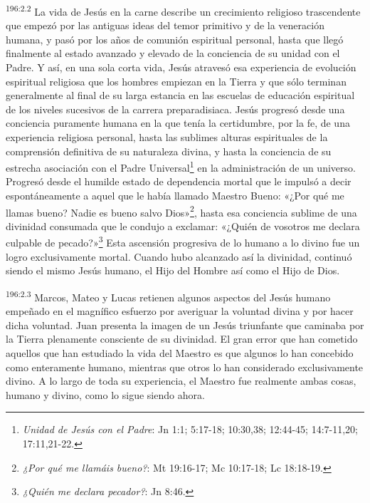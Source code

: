 \par 
\textsuperscript{196:2.2} La vida de Jesús en la carne describe un crecimiento religioso trascendente que empezó por las antiguas ideas del temor primitivo y de la veneración humana, y pasó por los años de comunión espiritual personal, hasta que llegó finalmente al estado avanzado y elevado de la conciencia de su unidad con el Padre. Y así, en una sola corta vida, Jesús atravesó esa experiencia de evolución espiritual religiosa que los hombres empiezan en la Tierra y que sólo terminan generalmente al final de su larga estancia en las escuelas de educación espiritual de los niveles sucesivos de la carrera preparadisiaca. Jesús progresó desde una conciencia puramente humana en la que tenía la certidumbre, por la fe, de una experiencia religiosa personal, hasta las sublimes alturas espirituales de la comprensión definitiva de su naturaleza divina, y hasta la conciencia de su estrecha asociación con el Padre Universal\footnote{\textit{Unidad de Jesús con el Padre}: Jn 1:1; 5:17-18; 10:30,38; 12:44-45; 14:7-11,20; 17:11,21-22.} en la administración de un universo. Progresó desde el humilde estado de dependencia mortal que le impulsó a decir espontáneamente a aquel que le había llamado Maestro Bueno: «¿Por qué me llamas bueno? Nadie es bueno salvo Dios»\footnote{\textit{¿Por qué me llamáis bueno?}: Mt 19:16-17; Mc 10:17-18; Lc 18:18-19.}, hasta esa conciencia sublime de una divinidad consumada que le condujo a exclamar: «¿Quién de vosotros me declara culpable de pecado?»\footnote{\textit{¿Quién me declara pecador?}: Jn 8:46.} Esta ascensión progresiva de lo humano a lo divino fue un logro exclusivamente mortal. Cuando hubo alcanzado así la divinidad, continuó siendo el mismo Jesús humano, el Hijo del Hombre así como el Hijo de Dios.

\par 
\textsuperscript{196:2.3} Marcos, Mateo y Lucas retienen algunos aspectos del Jesús humano empeñado en el magnífico esfuerzo por averiguar la voluntad divina y por hacer dicha voluntad. Juan presenta la imagen de un Jesús triunfante que caminaba por la Tierra plenamente consciente de su divinidad. El gran error que han cometido aquellos que han estudiado la vida del Maestro es que algunos lo han concebido como enteramente humano, mientras que otros lo han considerado exclusivamente divino. A lo largo de toda su experiencia, el Maestro fue realmente ambas cosas, humano y divino, como lo sigue siendo ahora.

